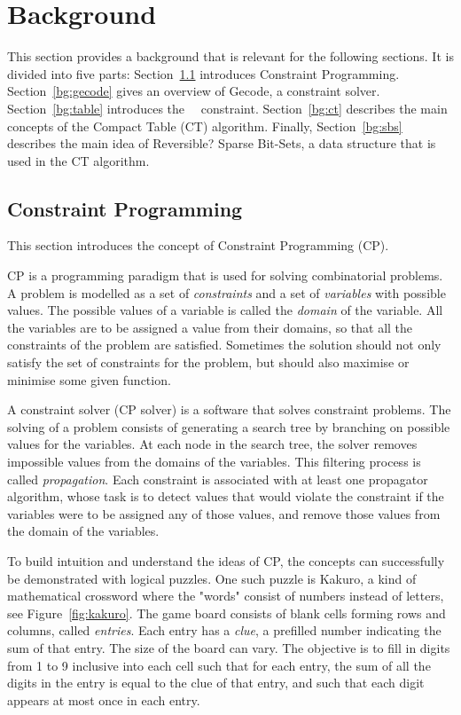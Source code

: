 \documentclass[a4paper,11pt]{article}
\newcommand{\Todo}[1]{{\color{blue}#1}}
\newcommand{\Secref}[1]{Section~\ref{#1}}
\newcommand{\Table}{\Constraint{Table}~}
\numberwithin{equation}{section}
\begin{document}
\section{Background}
\label{bg}


This section provides a background that is relevant for the
following sections. It is divided into five parts: \Secref{bg:cp}
introduces Constraint Programming. \Secref{bg:gecode} gives an overview
of Gecode, a constraint solver. \Secref{bg:table} introduces the~\Table
constraint. \Secref{bg:ct} describes the main concepts of the Compact
Table (CT) algorithm. Finally, \Secref{bg:sbs} describes the main
idea of \Todo{Reversible?} Sparse Bit-Sets,
a data structure that is used in the CT algorithm.

\subsection{Constraint Programming}
\label{bg:cp}
This section introduces the concept of Constraint Programming (CP).

CP is a programming paradigm that is used for solving
combinatorial problems. A problem is
modelled as a set of \emph{constraints} and a
set of \emph{variables} with possible values. The possible values of 
a variable is called the \emph{domain} of the variable.
All the variables are to be assigned a value
from their domains, so that all the constraints of the problem
are satisfied. Sometimes the solution should not only satisfy the set of constraints for the
problem, but should also maximise or minimise some given function.

A constraint solver (CP solver) is a software that solves constraint problems.
The solving of a problem consists of generating a search tree by branching
on possible values for the variables. At each node in the search tree,
the solver removes impossible values from the domains of the variables.
This filtering process is called \emph{propagation}. Each constraint is
associated with at least one propagator algorithm, whose task is to detect
values that would violate the constraint if the variables were to be assigned
any of those values, and remove those values from the domain of the variables.

To build intuition and understand the ideas of CP,
the concepts can successfully be demonstrated with logical puzzles. One such
puzzle is Kakuro, a kind of mathematical crossword where the "words" consist
of numbers instead of letters, see Figure~\ref{fig:kakuro}.
The game board consists of 
blank cells forming rows and columns, called \emph{entries}.
Each entry has a \emph{clue}, a prefilled number indicating the sum of that entry.
The size of the board can vary.
The objective is to fill
in digits from 1 to 9 inclusive into each cell such that for each entry,
the sum of all the digits in the entry is equal to the clue of that entry,
and such that each digit appears at most once in each entry.
\end{document}
